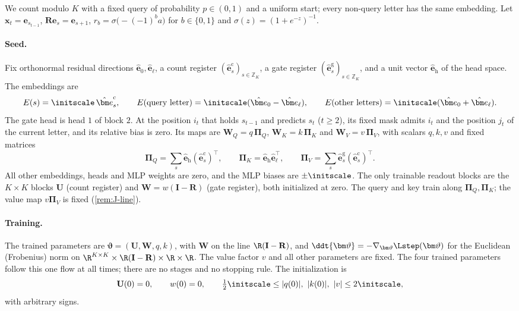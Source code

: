 We count modulo $K$ with a fixed query of probability $p\in(0,1)$ and a uniform start; every non-query letter has the same embedding. Let $\bm x_t=\bm e_{s_{t-1}}$, $\mathbf R\bm e_s=\bm e_{s+1}$, $r_b=\sigma\bigl(-(-1)^ba\bigr)$ for $b\in\{0,1\}$ and $\sigma(z)=(1+e^{-z})^{-1}$.

\paragraph{Seed.} Fix orthonormal residual directions $\hat{\bm e}_0,\hat{\bm e}_\ell$, a count register $(\hat{\bm e}^{\mathrm c}_s)_{s\in\mathbb Z_K}$, a gate register
$(\hat{\bm e}^{\mathrm g}_s)_{s\in\mathbb Z_K}$, and a unit vector $\hat{\bm e}_{\mathrm h}$ of the head space. The embeddings are
\[
 E(s)=\initscale\,\hat{\bm e}^{\mathrm c}_s,\qquad E(\text{query letter})=\initscale(\hat{\bm e}_0-\hat{\bm e}_\ell),\qquad E(\text{other letters})=\initscale(\hat{\bm e}_0+\hat{\bm e}_\ell).
\]
The gate head is head $1$ of block $2$. At the position $i_t$ that holds $s_{t-1}$ and predicts $s_t$ ($t\ge2$), its fixed mask admits
$i_t$ and the position $j_t$ of the current letter, and its relative bias is zero. Its maps are $\mathbf W_Q=q\,\bm\Pi_Q$, $\mathbf W_K=k\,\bm\Pi_K$ and
$\mathbf W_V=v\,\bm\Pi_V$, with scalars $q,k,v$ and fixed matrices
\[
 \bm\Pi_Q=\textstyle\sum_s\hat{\bm e}_{\mathrm h}(\hat{\bm e}^{\mathrm c}_s)^{\!\top},\qquad \bm\Pi_K=\hat{\bm e}_{\mathrm h}\hat{\bm e}_\ell^{\top},\qquad \bm\Pi_V=\sum_s\hat{\bm e}^{\mathrm g}_s(\hat{\bm e}^{\mathrm c}_s)^{\!\top}.
\]
All other embeddings, heads and MLP weights are zero, and the MLP biases are $\pm\initscale$. The only trainable readout blocks are the
$K\times K$ blocks $\mathbf U$ (count register) and $\mathbf W=w(\mathbf I-\mathbf R)$ (gate register), both initialized at zero.
The query and key train along $\bm\Pi_Q,\bm\Pi_K$; the value map $v\bm\Pi_V$ is fixed (\cref{rem:J-line}).

\paragraph{Training.} The trained parameters are $\bm\vartheta=(\mathbf U,\mathbf W,q,k)$, with $\mathbf W$ on the line $\R(\mathbf I-\mathbf R)$, and
$\ddt{\bm\vartheta}=-\nabla_{\bm\vartheta}\Lstep(\bm\vartheta)$ for the Euclidean (Frobenius) norm on $\R^{K\times K}\times\R(\mathbf I-\mathbf R)\times\R\times\R$. The value factor $v$
and all other parameters are fixed. The four trained parameters follow this one flow at all times; there are no stages and no stopping
rule. The initialization is
\[
 \mathbf U(0)=0,\qquad w(0)=0,\qquad \tfrac{1}{2}\initscale\le|q(0)|,\ |k(0)|,\ |v|\le2\initscale,
\]
with arbitrary signs.

